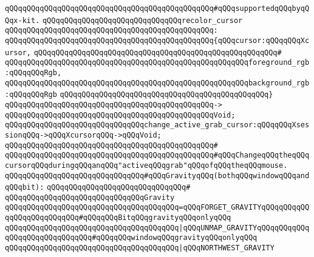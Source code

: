 \verb|qQQqqQQqqQQqqQQqqQQqqQQqqQQqqQQqqQQqqQQqqQQqqQQq#qQQqsupportedqQQqbyqQQqx-kit.|\newline
\newline
\verb|qQQqqQQqqQQqqQQqqQQqqQQqqQQqqQQqrecolor_cursor|\newline
\verb|qQQqqQQqqQQqqQQqqQQqqQQqqQQqqQQqqQQqqQQqqQQqqQQq:|\newline
\verb|qQQqqQQqqQQqqQQqqQQqqQQqqQQqqQQqqQQqqQQqqQQqqQQq{qQQqcursor:qQQqqQQqXcursor,|\newline
\verb|qQQqqQQqqQQqqQQqqQQqqQQqqQQqqQQqqQQqqQQqqQQqqQQqqQQqqQQq#|\newline
\verb|qQQqqQQqqQQqqQQqqQQqqQQqqQQqqQQqqQQqqQQqqQQqqQQqqQQqqQQqforeground_rgb:qQQqqQQqRgb,|\newline
\verb|qQQqqQQqqQQqqQQqqQQqqQQqqQQqqQQqqQQqqQQqqQQqqQQqqQQqqQQqbackground_rgb:qQQqqQQqRgb|\newline
\verb|qQQqqQQqqQQqqQQqqQQqqQQqqQQqqQQqqQQqqQQqqQQqqQQq}|\newline
\verb|qQQqqQQqqQQqqQQqqQQqqQQqqQQqqQQqqQQqqQQqqQQqqQQq->|\newline
\verb|qQQqqQQqqQQqqQQqqQQqqQQqqQQqqQQqqQQqqQQqqQQqqQQqVoid;|\newline
\newline
\newline
\verb|qQQqqQQqqQQqqQQqqQQqqQQqqQQqqQQqchange_active_grab_cursor:qQQqqQQqXsessionqQQq->qQQqXcursorqQQq->qQQqVoid;|\newline
\verb|qQQqqQQqqQQqqQQqqQQqqQQqqQQqqQQqqQQqqQQqqQQqqQQq#|\newline
\verb|qQQqqQQqqQQqqQQqqQQqqQQqqQQqqQQqqQQqqQQqqQQqqQQq#qQQqChangeqQQqtheqQQqcursorqQQqduringqQQqanqQQq"activeqQQqgrab"qQQqofqQQqtheqQQqmouse.|\newline
\newline
\verb|qQQqqQQqqQQqqQQqqQQqqQQqqQQqqQQq#qQQqGravityqQQq(bothqQQqwindowqQQqandqQQqbit):|\newline
\verb|qQQqqQQqqQQqqQQqqQQqqQQqqQQqqQQq#|\newline
\verb|qQQqqQQqqQQqqQQqqQQqqQQqqQQqqQQqGravity|\newline
\verb|qQQqqQQqqQQqqQQqqQQqqQQqqQQqqQQqqQQqqQQq=qQQqFORGET_GRAVITYqQQqqQQqqQQqqQQqqQQqqQQqqQQq#qQQqqQQqBitqQQqgravityqQQqonlyqQQq|\newline
\verb|qQQqqQQqqQQqqQQqqQQqqQQqqQQqqQQqqQQqqQQq|\verb#|qQQqUNMAP_GRAVITYqQQqqQQqqQQqqQQqqQQqqQQqqQQqqQQq#\verb|#qQQqqQQqwindowqQQqgravityqQQqonlyqQQq|\newline
\verb|qQQqqQQqqQQqqQQqqQQqqQQqqQQqqQQqqQQqqQQq|\verb#|qQQqNORTHWEST_GRAVITY#\newline

